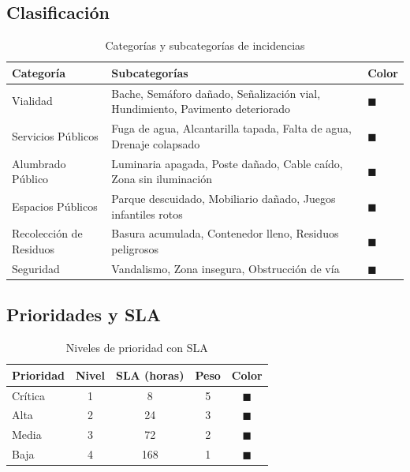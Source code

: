 \documentclass[11pt, a4paper]{article}
\begin{document}
\subsection{Clasificación}

\begin{table}[H]
\centering
\begin{tabularx}{\textwidth}{l X l}
  \toprule
  \textbf{Categoría} & \textbf{Subcategorías} & \textbf{Color} \\
  \midrule
  Vialidad             & Bache, Semáforo dañado, Señalización vial, Hundimiento, Pavimento deteriorado & \textcolor[HTML]{6366F1}{$\blacksquare$} \\
  Servicios Públicos   & Fuga de agua, Alcantarilla tapada, Falta de agua, Drenaje colapsado & \textcolor[HTML]{0EA5E9}{$\blacksquare$} \\
  Alumbrado Público    & Luminaria apagada, Poste dañado, Cable caído, Zona sin iluminación & \textcolor[HTML]{F59E0B}{$\blacksquare$} \\
  Espacios Públicos    & Parque descuidado, Mobiliario dañado, Juegos infantiles rotos & \textcolor[HTML]{22C55E}{$\blacksquare$} \\
  Recolección de Residuos & Basura acumulada, Contenedor lleno, Residuos peligrosos & \textcolor[HTML]{A855F7}{$\blacksquare$} \\
  Seguridad            & Vandalismo, Zona insegura, Obstrucción de vía & \textcolor[HTML]{EF4444}{$\blacksquare$} \\
  \bottomrule
\end{tabularx}
\caption{Categorías y subcategorías de incidencias}
\end{table}

\subsection{Prioridades y SLA}

\begin{table}[H]
\centering
\begin{tabular}{l c c c c}
  \toprule
  \textbf{Prioridad} & \textbf{Nivel} & \textbf{SLA (horas)} & \textbf{Peso} & \textbf{Color} \\
  \midrule
  Crítica & 1 & 8   & 5 & \textcolor[HTML]{DC2626}{$\blacksquare$} \\
  Alta    & 2 & 24  & 3 & \textcolor[HTML]{F97316}{$\blacksquare$} \\
  Media   & 3 & 72  & 2 & \textcolor[HTML]{EAB308}{$\blacksquare$} \\
  Baja    & 4 & 168 & 1 & \textcolor[HTML]{22C55E}{$\blacksquare$} \\
  \bottomrule
\end{tabular}
\caption{Niveles de prioridad con SLA}
\end{table}
\end{document}
